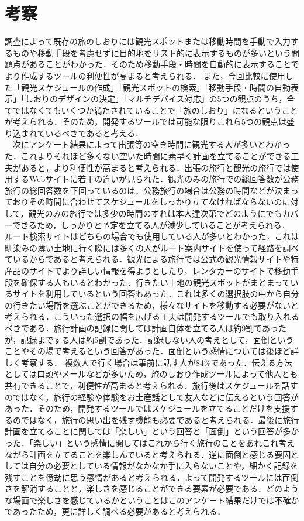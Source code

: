 \documentclass{funthesis}
\begin{document}
\section{考察}
調査によって既存の旅のしおりには観光スポットまたは移動時間を手動で入力するものや移動手段を考慮せずに目的地をリスト的に表示するものが多いという問題点があることがわかった．そのため移動手段・時間を自動的に表示することでより作成するツールの利便性が高まると考えられる．
また，今回比較に使用した「観光スケジュールの作成」「観光スポットの検索」「移動手段・時間の自動表示」「しおりのデザインの決定」「マルチデバイス対応」の5つの観点のうち，全てではなくてもいくつか満たされていることで「旅のしおり」になるということが考えられる．そのため，開発するツールでは可能な限りこれら5つの観点は盛り込まれているべきであると考える．\\
　次にアンケート結果によって出張等の空き時間に観光する人が多いとわかった．これよりそれほど多くない空いた時間に素早く計画を立てることができる工夫があると，より利便性が高まると考えられる．出張の旅行と観光の旅行では使用するWebサイトに若干の違いが見られた．観光のみの旅行での総回答数が公務旅行の総回答数を下回っているのは．公務旅行の場合は公務の時間などが決まっておりその時間に合わせてスケジュールをしっかり立てなければならないのに対して，観光のみの旅行では多少の時間のずれは本人達次第でどのようにでもカバーできるため，しっかりと予定を立てる人が減少していることが考えられる．
ルート検索サイトはどちらの場合でも使用している人が多いとわかった．これは馴染みの薄い土地に行く際には多くの人がルート案内サイトを使って経路を調べているからであると考えられる．観光による旅行では公式の観光情報サイトや特産品のサイトでより詳しい情報を得ようとしたり，レンタカーのサイトで移動手段を確保する人もいるとわかった．行きたい土地の観光スポットがまとまっているサイトを利用しているという回答もあった．これは多くの選択肢の中から自分の行きたい場所を選ぶことができるため，様々なサイトを移動する必要がないと考えられる．こういった選択の幅を広げる工夫は開発するツールでも取り入れるべきである．旅行計画の記録に関しては計画自体を立てる人は約9割であったが，記録までする人は約5割であった．記録しない人の考えとして，面倒ということやその場で考えるという回答があった．面倒という感情については後ほど詳しく考察する．
複数人で行く場合は事前に話す人が84\%であった．伝える方法としては口頭やメールなどが多いため，旅のしおり作成ツールによって他人とも共有できることで，利便性が高まると考えられる．旅行後はスケジュールを話すのではなく，旅行の経験や体験をお土産話として友人などに伝えるという回答があった．そのため，開発するツールではスケジュールを立てることだけを支援するのではなく，旅行の思い出を残す機能も必要であると考えられる．最後に旅行計画を立てることに関しては「楽しい」という回答と「面倒」という回答が多かった．「楽しい」という感情に関してはこれから行く旅行のことをあれこれ考えながら計画を立てることを楽しんでいると考えられる．逆に面倒と感じる要因としては自分の必要としている情報がなかなか手に入らないことや，細かく記録を残すことを億劫に思う感情があると考えられる．よって開発するツールには面倒さを解消することと，楽しさを感じることができる要素が必要である．どのような場面で楽しさを感じているかということはこのアンケート結果だけでは不確かであったため，更に詳しく調べる必要があると考えられる．
\end{document}
